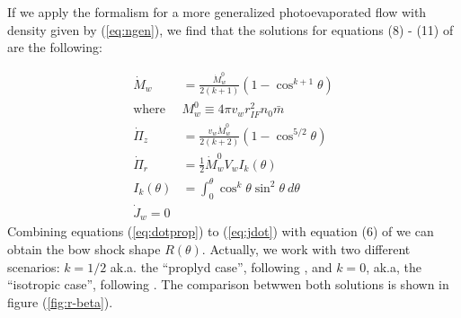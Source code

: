 If we apply the \CRW{} formalism for a more generalized photoevaporated flow with density given by (\ref{eq:ngen}), we find that the solutions for equations (8) - (11) of \CRW{} are the following:

\begin{align}
\dot{M}_w &= \frac{\dot{M}_w^0}{2(k+1)}\left(1-\cos^{k+1}\theta\right) \label{eq:dotprop} \\
\mathrm{where} & M^0_w \equiv 4\pi v_w r^2_{IF} n_0 \bar{m}\\
\dot{\Pi}_z &= \frac{v_w\dot{M}_w^0}{2(k+2)}\left(1-\cos^{5/2}\theta\right)  \label{eq:pir}\\
\dot{\Pi}_r &= \frac{1}{2}\dot{M}^0_w V_w I_k (\theta) \label{eq:piz}\\
I_k(\theta) & = \int^\theta_0 \cos^k \theta \sin^2\theta~d\theta \\
\dot{J}_w = 0 \label{eq:jdot}
\end{align}  
Combining equations  (\ref{eq:dotprop}) to (\ref{eq:jdot}) with equation (6) of \CRW{}  we can obtain the bow shock shape $R(\theta)$. Actually, we work with two different scenarios:
$k=1/2$ ak.a. the ``proplyd case'', following \citep{HA:1998}, and $k=0$, ak.a, the ``isotropic case'', following \CRW{}. The comparison betwwen both solutions is shown in figure (\ref{fig:r-beta}).






